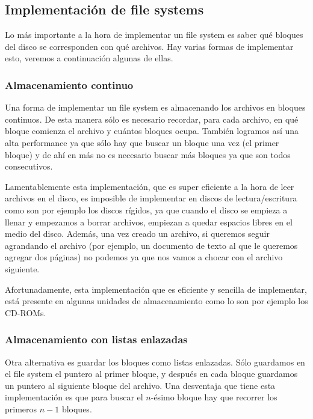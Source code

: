 \documentclass{article}
\begin{document}
\subsection{Implementaci\'on de file systems}

Lo m\'as importante a la hora de implementar un file system es saber qu\'e bloques del disco se corresponden con qu\'e archivos. Hay varias formas de implementar esto, veremos a continuaci\'on algunas de ellas.

\subsubsection{Almacenamiento continuo}

Una forma de implementar un file system es almacenando los archivos en bloques continuos. De esta manera s\'olo es necesario recordar, para cada archivo, en qu\'e bloque comienza el archivo y cu\'antos bloques ocupa. Tambi\'en logramos as\'i una alta performance ya que s\'olo hay que buscar un bloque una vez (el primer bloque) y de ah\'i en m\'as no es necesario buscar m\'as bloques ya que son todos consecutivos.

Lamentablemente esta implementaci\'on, que es super eficiente a la hora de leer archivos en el disco, es imposible de implementar en discos de lectura/escritura como son por ejemplo los discos r\'igidos, ya que cuando el disco se empieza a llenar y empezamos a borrar archivos, empiezan a quedar espacios libres en el medio del disco. Adem\'as, una vez creado un archivo, si queremos seguir agrandando el archivo (por ejemplo, un documento de texto al que le queremos agregar dos p\'aginas) no podemos ya que nos vamos a chocar con el archivo siguiente.

Afortunadamente, esta implementaci\'on que es eficiente y sencilla de implementar, est\'a presente en algunas unidades de almacenamiento como lo son por ejemplo los CD-ROMs.

\subsubsection{Almacenamiento con listas enlazadas}

Otra alternativa es guardar los bloques como listas enlazadas. S\'olo guardamos en el file system el puntero al primer bloque, y despu\'es en cada bloque guardamos un puntero al siguiente bloque del archivo. Una desventaja que tiene esta implementaci\'on es que para buscar el $n$-\'esimo bloque hay que recorrer los primeros $n-1$ bloques.
\end{document}
